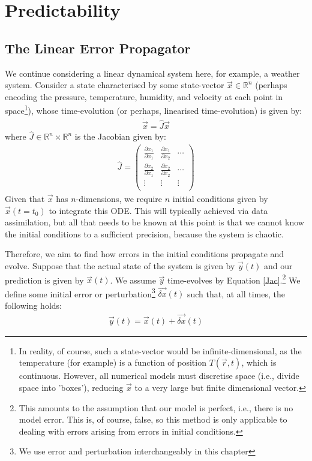 \chapter{Predictability}\label{Predictability}

\section{The Linear Error Propagator}

We continue considering a linear dynamical system here, for example, a weather system. Consider a state characterised by some state-vector $\vec{x}\in\mathbb{R}^n$ (perhaps encoding the pressure, temperature, humidity, and velocity at each point in space\footnote{In reality, of course, such a state-vector would be infinite-dimensional, as the temperature (for example) is a function of position $T(\vec{r},t)$, which is continuous. However, all numerical models must discretise space (i.e., divide space into 'boxes'), reducing $\vec{x}$ to a very large but finite dimensional vector.}), whose time-evolution (or perhaps, linearised time-evolution) is given by:
\begin{align}\label{Jac}
    \dot{\vec{x}} = \hat{J}\vec{x}
\end{align}
where $\hat{J}\in\mathbb{R}^n\times\mathbb{R}^n$ is the Jacobian given by:
\begin{align}
    {\hat{J}}  =  \left( \begin{array}{ccc}
    \frac{\partial \dot{x}_1}{\partial x_1} & \frac{\partial \dot{x}_1}{\partial x_2} & \cdots \\
    \frac{\partial \dot{x}_2}{\partial x_1} & \frac{\partial \dot{x}_2}{\partial x_2} & \cdots \\
    \vdots & \vdots & \vdots \\
    \end{array} \right)
\end{align} 
Given that $\vec{x}$ has $n$-dimensions, we require $n$ initial conditions given by $\vec{x}(t=t_0)$ to integrate this ODE. This will typically achieved via data assimilation, but all that needs to be known at this point is that we cannot know the initial conditions to a sufficient precision, because the system is chaotic.

Therefore, we aim to find how errors in the initial conditions propagate and evolve. Suppose that the actual state of the system is given by $\vec{y}(t)$ and our prediction is given by $\vec{x}(t)$. We assume $\vec{y}$ time-evolves by Equation \ref{Jac}.\footnote{This amounts to the assumption that our model is perfect, i.e., there is no model error. This is, of course, false, so this method is only applicable to dealing with errors arising from errors in initial conditions.} We define some initial error or perturbation\footnote{We use error and perturbation interchangeably in this chapter} $\vec{\delta x}(t)$ such that, at all times, the following holds:
\begin{align}
    \vec{y}(t)=\vec{x}(t)+\vec{\delta x}(t)
\end{align}

